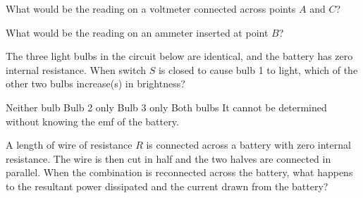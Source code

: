 \documentclass[12pt]{../oss-classkick-exam}
\begin{document}
\begin{questions}
  \uplevel{\rule{\linewidth}{.5pt}}

  \question What would be the reading on a voltmeter connected across points
  $A$ and $C$?
  \label{rcirc1}

  \question What would be the reading on an ammeter inserted at point $B$?
  \label{rcirc2}
  


  \question The three light bulbs in the circuit below are identical, and the
  battery has zero internal resistance. When switch $S$ is closed to cause
  bulb 1 to light, which of the other two bulbs increase(s) in brightness?
  \begin{choices}
    \choice Neither bulb
    \choice Bulb 2 only
    \choice Bulb 3 only
    \choice Both bulbs
    \choice It cannot be determined without knowing the emf of the battery.
  \end{choices}
  
  \uplevel{
    \rule{\linewidth}{.5pt}
  }
    
  \question A length of wire of resistance $R$ is connected across a battery
  with zero internal resistance. The wire is then cut in half and the two
  halves are connected in parallel. When the combination is reconnected across
  the battery, what happens to the resultant power dissipated and the current
  drawn from the battery?


\end{questions}
\end{document}
